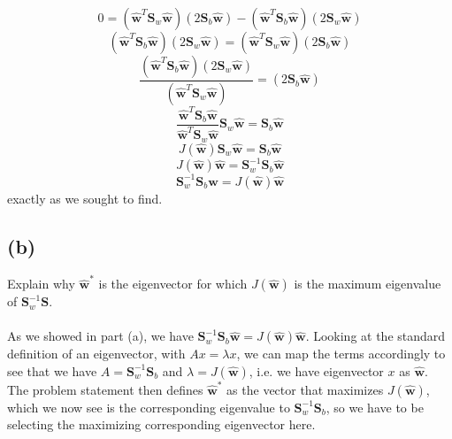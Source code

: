 \documentclass{article}
\begin{document}
{\[
  0 = (\hat{\mathbf{w}}^T \mathbf{S}_w \hat{\mathbf{w}})(2\mathbf{S}_b \hat{\mathbf{w}}) - (\hat{\mathbf{w}}^T \mathbf{S}_b \hat{\mathbf{w}})(2\mathbf{S}_w \hat{\mathbf{w}})
\]
\[
  (\hat{\mathbf{w}}^T \mathbf{S}_b \hat{\mathbf{w}})(2\mathbf{S}_w \hat{\mathbf{w}}) = (\hat{\mathbf{w}}^T \mathbf{S}_w \hat{\mathbf{w}})(2\mathbf{S}_b \hat{\mathbf{w}})
\]
\[
  \frac{(\hat{\mathbf{w}}^T \mathbf{S}_b \hat{\mathbf{w}})(2\mathbf{S}_w \hat{\mathbf{w}})}{(\hat{\mathbf{w}}^T \mathbf{S}_w \hat{\mathbf{w}})} = (2\mathbf{S}_b \hat{\mathbf{w}})
\]
\[
  \frac{\hat{\mathbf{w}}^T \mathbf{S}_b \hat{\mathbf{w}}}{\hat{\mathbf{w}}^T \mathbf{S}_w \hat{\mathbf{w}}} \mathbf{S}_w \hat{\mathbf{w}} = \mathbf{S}_b \hat{\mathbf{w}}
\]
\[
  J(\hat{\mathbf{w}}) \mathbf{S}_w \hat{\mathbf{w}} = \mathbf{S}_b \hat{\mathbf{w}}
\]
\[
  J(\hat{\mathbf{w}}) \hat{\mathbf{w}} = \mathbf{S}_w^{-1}\mathbf{S}_b \hat{\mathbf{w}}
\]
\[
  \mathbf{S}_w^{-1}\mathbf{S}_b \hat{\mathbf{w}} = J(\hat{\mathbf{w}}) \hat{\mathbf{w}}
\]
exactly as we sought to find. 

\subsection*{(b)}
Explain why \(\hat{\mathbf{w}}^*\) is the eigenvector for which \(J(\hat{\mathbf{w}})\) is the maximum eigenvalue of \(\mathbf{S}_w^{-1} \mathbf{S}.\) \\ \\
As we showed in part (a), we have \(\mathbf{S}_w^{-1}\mathbf{S}_b \hat{\mathbf{w}} = J(\hat{\mathbf{w}}) \hat{\mathbf{w}}\). Looking at the standard definition of an eigenvector, with \(Ax = \lambda x\), we can map the terms accordingly to see that we have \(A = \mathbf{S}_w^{-1}\mathbf{S}_b\) and \(\lambda = J(\hat{\mathbf{w}})\), i.e. we have eigenvector \(x\) as \(\hat{\mathbf{w}}\). The problem statement then defines \(\hat{\mathbf{w}}^*\) as the vector that maximizes \(J(\hat{\mathbf{w}})\), which we now see is the corresponding eigenvalue to \(\mathbf{S}_w^{-1}\mathbf{S}_b\), so we have to be selecting the maximizing corresponding eigenvector here. 

}
\end{document}
